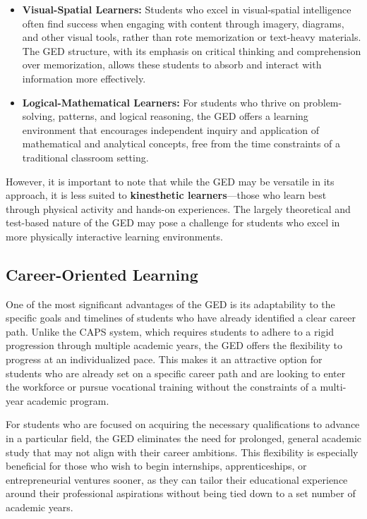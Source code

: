 \documentclass[12pt]{article}
\begin{document}
\begin{itemize}
    \item \textbf{Visual-Spatial Learners:} Students who excel in visual-spatial intelligence often find success when engaging with content through imagery, diagrams, and other visual tools, rather than rote memorization or text-heavy materials. The GED structure, with its emphasis on critical thinking and comprehension over memorization, allows these students to absorb and interact with information more effectively.
    
    \item \textbf{Logical-Mathematical Learners:} For students who thrive on problem-solving, patterns, and logical reasoning, the GED offers a learning environment that encourages independent inquiry and application of mathematical and analytical concepts, free from the time constraints of a traditional classroom setting.
\end{itemize}

However, it is important to note that while the GED may be versatile in its approach, it is less suited to \textbf{kinesthetic learners}—those who learn best through physical activity and hands-on experiences. The largely theoretical and test-based nature of the GED may pose a challenge for students who excel in more physically interactive learning environments.

\subsection{Career-Oriented Learning}

One of the most significant advantages of the GED is its adaptability to the specific goals and timelines of students who have already identified a clear career path. Unlike the CAPS system, which requires students to adhere to a rigid progression through multiple academic years, the GED offers the flexibility to progress at an individualized pace. This makes it an attractive option for students who are already set on a specific career path and are looking to enter the workforce or pursue vocational training without the constraints of a multi-year academic program.

For students who are focused on acquiring the necessary qualifications to advance in a particular field, the GED eliminates the need for prolonged, general academic study that may not align with their career ambitions. This flexibility is especially beneficial for those who wish to begin internships, apprenticeships, or entrepreneurial ventures sooner, as they can tailor their educational experience around their professional aspirations without being tied down to a set number of academic years.
\end{document}
